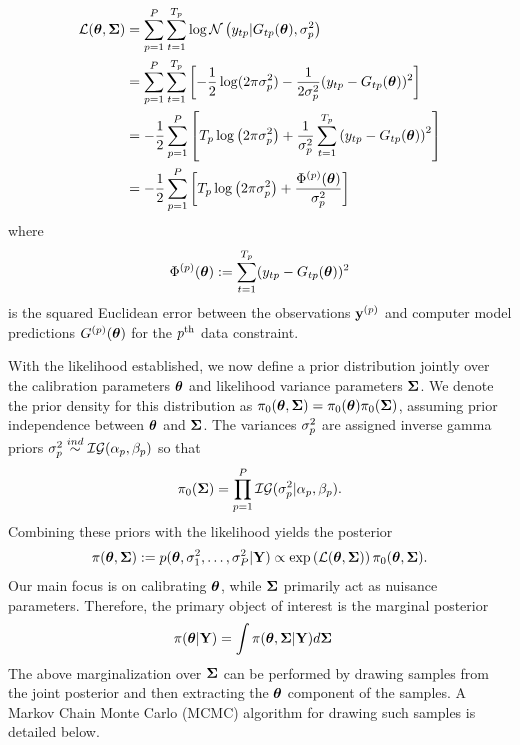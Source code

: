 \documentclass[12pt]{article}
\begin{document}
\begin{align}
\mathcal{L}(\boldsymbol{\theta}, \boldsymbol{\Sigma}) &= \sum_{p = 1}^{P} \sum_{t = 1}^{T_{p}} \log \mathcal{N}\left(y_{t p}| G_{t p}(\boldsymbol{\theta}), \sigma_{p}^2 \right) \nonumber \\
	         &= \sum_{p = 1}^{P}  \sum_{t = 1}^{T_{p}} \left[-\frac{1}{2} \log(2\pi \sigma_{p}^2) - \frac{1}{2\sigma_{p}^2} (y_{t p} - G_{t p}(\boldsymbol{\theta}))^2\right] \nonumber \\
	         &= -\frac{1}{2} \sum_{p = 1}^{P} \left[T_{p} \log\left(2\pi \sigma_{p}^2 \right) + \frac{1}{\sigma_{p}^2}\sum_{t = 1}^{T_{p}} \left(y_{t p} - 
	                G_{t p}(\boldsymbol{\theta})\right)^2  \right] \nonumber \\
	         &= -\frac{1}{2} \sum_{p = 1}^{P} \left[T_{p} \log\left(2\pi \sigma_{p}^2 \right) + \frac{\Phi^{(p)}(\boldsymbol{\theta})}{\sigma_{p}^2} \right] \label{llik}
\end{align}
where 
\begin{align}
\Phi^{(p)}(\boldsymbol{\theta}) := \sum_{t = 1}^{T_{p}} (y_{t p} - G_{t p}(\boldsymbol{\theta}))^2
\end{align}
is the squared Euclidean error between the observations $\mathbf{y}^{(p)}$ and computer model predictions $G^{(p)}(\boldsymbol{\theta})$ for the $p^{\text{th}}$ data constraint. 

With the likelihood established, we now define a prior distribution jointly over the calibration parameters $\boldsymbol{\theta}$ and likelihood variance parameters $\boldsymbol{\Sigma}$. 
We denote the prior density for this distribution as $\pi_0(\boldsymbol{\theta}, \boldsymbol{\Sigma}) = \pi_0(\boldsymbol{\theta})\pi_0(\boldsymbol{\Sigma})$, assuming prior independence between $\boldsymbol{\theta}$ and $\boldsymbol{\Sigma}$.  
The variances $\sigma_{p}^2$ are assigned inverse gamma priors $\sigma_{p}^2 \overset{ind}{\sim} \mathcal{IG}(\alpha_p, \beta_p)$ so that 
\begin{align}
\pi_0(\boldsymbol{\Sigma}) = \prod_{p = 1}^{P} \mathcal{IG}(\sigma_{p}^2|\alpha_p, \beta_p). \label{inv_gamma_prior}
\end{align}
Combining these priors with the likelihood yields the posterior 
\begin{align}
\pi(\boldsymbol{\theta}, \boldsymbol{\Sigma}) := p(\boldsymbol{\theta}, \sigma_{1}^2, \dots, \sigma_{P}^2|\mathbf{Y}) \propto \exp\left(\mathcal{L}(\boldsymbol{\theta}, \boldsymbol{\Sigma})\right)\pi_0(\boldsymbol{\theta}, \boldsymbol{\Sigma}).
\end{align}
Our main focus is on calibrating $\boldsymbol{\theta}$, while $\boldsymbol{\Sigma}$ primarily act as nuisance parameters. Therefore, the primary object of interest is the marginal posterior
\begin{align*}
\pi(\boldsymbol{\theta}|\mathbf{Y}) &= \int \pi(\boldsymbol{\theta}, \boldsymbol{\Sigma}|\mathbf{Y}) d\boldsymbol{\Sigma} 
\end{align*}
The above marginalization over $\boldsymbol{\Sigma}$ can be performed by drawing samples from the joint posterior and then extracting the $\boldsymbol{\theta}$ component of the samples. A 
Markov Chain Monte Carlo (MCMC) algorithm for drawing such samples is detailed below.  
\end{document}
